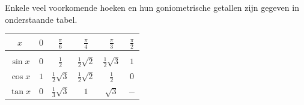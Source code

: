 \documentclass[11pt]{article}
\begin{document}














 Enkele veel voorkomende hoeken en hun
goniometrische getallen zijn gegeven in onderstaande tabel.

\begin{center}
\begin{tabular}{|c|c|c|c|c|c|} \hline
$x$      & $0$ & $\frac{\pi}{6}$ & $\frac{\pi}{4}$ & $\frac{\pi}{3}$ & $\frac{\pi}{2}$ \\[5pt] \hline
  &  & & &  &  \\
$\sin x$ & $0$ & $\frac{1}{2}$  & $\frac{1}{2} \sqrt{2}$ & $\frac{1}{2}\sqrt{3}$ & $1$ \\[10pt]
$\cos x$ & $1$ & $\frac{1}{2} \sqrt{3}$ & $\frac{1}{2} \sqrt{2}$ & $\frac{1}{2}$ & $0$ \\[10pt]
$\tan x$ & $0$ & $\frac{1}{3} \sqrt{3}$ & $1$ & $\sqrt{3}$ & $-$ \\[5pt] \hline
\end{tabular}
\end{center}
\end{document}
